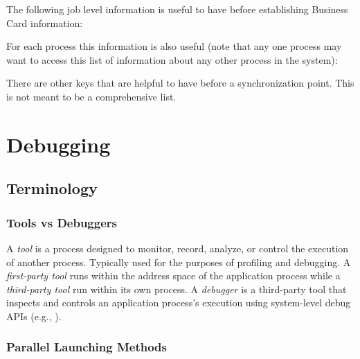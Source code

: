 {\large {}}

{\large {}}


The following job level information is useful to have before establishing Business Card information:


For each process this information is also useful (note that any one process may want to access this list of information about any other process in the system):


There are other keys that are helpful to have before a synchronization point. This is not meant to be a comprehensive list.

\section{Debugging}
\label{app:uc-debugging}

\subsection{Terminology}

\subsubsection{Tools vs Debuggers}

A \textit{tool} is a process designed to monitor, record, analyze, or control the execution of another process.  Typically used for the purposes of profiling and debugging. A \textit{first-party tool} runs within the address space of the application process while a \textit{third-party tool} run within its own process. A \textit{debugger} is a third-party tool that inspects and controls an application process's execution using system-level debug APIs (e.g., ).

\subsubsection{Parallel Launching Methods}

